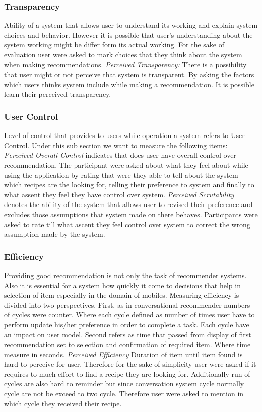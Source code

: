 \subsubsection{Transparency}
Ability of a system that allows user to understand its working and explain system choices and behavior. However it is possible that user’s understanding about the system working might be differ form its actual working. For the sake of evaluation user were asked to mark choices that they think about the system when making recommendations. \newline
\textit{Perceived Transparency:} There is a possibility that user might or not perceive that system is transparent. By asking the factors which users thinks system include while making a recommendation. It is possible learn their perceived transparency.

\subsubsection{User Control}
Level of control that provides to users while operation a system refers to User Control. Under this sub section we want to measure the following items:  \newline
\textit{Perceived Overall Control} indicates that does user have overall control over recommendation. The participant were asked about what they feel about while using the application by rating that were they able to tell about the system which recipes are the looking for, telling their preference to system and finally to what assent they feel they have control over system. \newline
\textit{Perceived Scrutability} denotes the ability of the system that allows user to revised their preference and excludes those assumptions that system made on there behaves. Participants were asked to rate till what ascent they feel control over system to correct the wrong assumption made by the system.
\subsubsection{Efficiency}
Providing good recommendation is not only the task of recommender systems. Also it is essential for a system how quickly it come to decisions that help in selection of item especially in the domain of mobiles. Measuring efficiency is divided into two perspectives. First, as in conversational recommender numbers of cycles were counter.  Where each cycle defined as number of times user have to perform update his/her preference in order to complete a task. Each cycle have an impact on user model. Second refers as time that passed from display of first recommendation set to selection and confirmation of required item. Where time measure in seconds.\newline
\textit{Perceived Efficiency} Duration of item until item found is hard to perceive for user. Therefore for the sake of simplicity user were asked if it requires to much effort to find a recipe they are looking for. Additionally run of cycles are also hard to reminder but since conversation system cycle normally cycle are not be exceed to two cycle. Therefore user were asked to mention in which cycle they received their recipe. 
